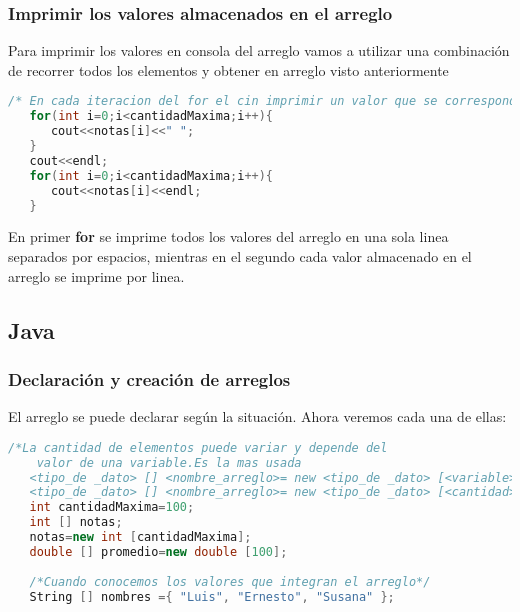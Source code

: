 \subsubsection{Imprimir los valores almacenados en el arreglo}

Para imprimir los valores en consola del arreglo vamos a utilizar una combinación de recorrer todos los elementos y obtener en arreglo visto anteriormente

\begin{lstlisting}[language=C++]
   /* En cada iteracion del for el cin imprimir un valor que se corresponde con el almacenado en el arreglo en la posicion que indique el valor de la variable i en esa iteracion, en la primera el valor seria 0, en la segunda 1 y asi sucesivamente. Tener en cuenta que los valores de i esten en rango de posiciones validas del arreglo */
   for(int i=0;i<cantidadMaxima;i++){
      cout<<notas[i]<<" ";
   }
   cout<<endl;
   for(int i=0;i<cantidadMaxima;i++){
      cout<<notas[i]<<endl;
   } 
\end{lstlisting}

En primer \textbf{for} se imprime todos los valores del arreglo en una sola linea separados por espacios, mientras en el segundo cada valor almacenado en el arreglo se imprime por linea.

\subsection{Java}

\subsubsection{Declaración y creación de arreglos}

El arreglo se puede declarar según la situación. Ahora veremos cada una de ellas:

\begin{lstlisting}[language=C++]
   /*La cantidad de elementos puede variar y depende del 
    valor de una variable.Es la mas usada
   <tipo_de _dato> [] <nombre_arreglo>= new <tipo_de _dato> [<variable>];
   <tipo_de _dato> [] <nombre_arreglo>= new <tipo_de _dato> [<cantidad>];*/
   int cantidadMaxima=100;
   int [] notas;
   notas=new int [cantidadMaxima]; 
   double [] promedio=new double [100];
   
   /*Cuando conocemos los valores que integran el arreglo*/
   String [] nombres ={ "Luis", "Ernesto", "Susana" };
\end{lstlisting}

